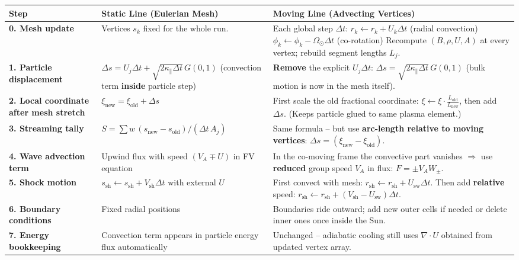 \begin{table}[h!]
\centering
\begin{tabular}{|p{5cm}|p{5.5cm}|p{5.5cm}|}
\hline
\textbf{Step} & \textbf{Static Line (Eulerian Mesh)} & \textbf{Moving Line (Advecting Vertices)} \\
\hline
\textbf{0. Mesh update} & Vertices $s_k$ fixed for the whole run. & Each global step $\Delta t$: \newline $r_k \leftarrow r_k + U_k \Delta t$ (radial convection) \newline $\phi_k \leftarrow \phi_k - \Omega_\odot \Delta t$ (co-rotation) \newline Recompute $(B,\rho,U,A)$ at every vertex; rebuild segment lengths $L_j$. \\
\hline
\textbf{1. Particle displacement} & $\Delta s = U_j \Delta t + \sqrt{2\kappa_\parallel \Delta t}\, G(0,1)$ \newline (convection term \textbf{inside} particle step) & \textbf{Remove} the explicit $U_j \Delta t$: \newline $\Delta s = \sqrt{2\kappa_\parallel \Delta t}\, G(0,1)$ \newline (bulk motion is now in the mesh itself). \\
\hline
\textbf{2. Local coordinate after mesh stretch} & $\xi_{\text{new}} = \xi_{\text{old}} + \Delta s$ & First scale the old fractional coordinate: \newline $\xi \leftarrow \xi \cdot \frac{L_{\text{old}}}{L_{\text{new}}}$, then add $\Delta s$. \newline (Keeps particle glued to same plasma element.) \\
\hline
\textbf{3. Streaming tally} & $S = \sum w \, (s_{\text{new}} - s_{\text{old}})/(\Delta t \, A_j)$ & Same formula – but use \textbf{arc-length relative to moving vertices}: \newline $\Delta s = (\xi_{\text{new}} - \xi_{\text{old}})$. \\
\hline
\textbf{4. Wave advection term} & Upwind flux with speed $(V_A \mp U)$ in FV equation & In the co-moving frame the convective part vanishes $\Rightarrow$ use \textbf{reduced} group speed $V_A$ in flux: \newline $F = \pm V_A W_\pm$. \\
\hline
\textbf{5. Shock motion} & $s_{\text{sh}} \leftarrow s_{\text{sh}} + V_{\text{sh}} \Delta t$ with external $U$ & First convect with mesh: $r_{\text{sh}} \leftarrow r_{\text{sh}} + U_{\text{sw}} \Delta t$. \newline Then add \textbf{relative} speed: $r_{\text{sh}} \leftarrow r_{\text{sh}} + (V_{\text{sh}} - U_{\text{sw}}) \Delta t$. \\
\hline
\textbf{6. Boundary conditions} & Fixed radial positions & Boundaries ride outward; add new outer cells if needed or delete inner ones once inside the Sun. \\
\hline
\textbf{7. Energy bookkeeping} & Convection term appears in particle energy flux automatically & Unchanged – adiabatic cooling still uses $\nabla \cdot U$ obtained from updated vertex array. \\
\hline
\end{tabular}
\end{table}

